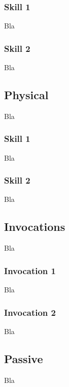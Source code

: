 \documentclass[a4paper,12pt]{book}
\begin{document}
\subsubsection{Skill 1}
Bla
\subsubsection{Skill 2}
Bla
\subsection{Physical}
Bla
\subsubsection{Skill 1}
Bla
\subsubsection{Skill 2}
Bla
\subsection{Invocations}
Bla
\subsubsection{Invocation 1}
Bla
\subsubsection{Invocation 2}
Bla
\subsection{Passive}
Bla
\end{document}
